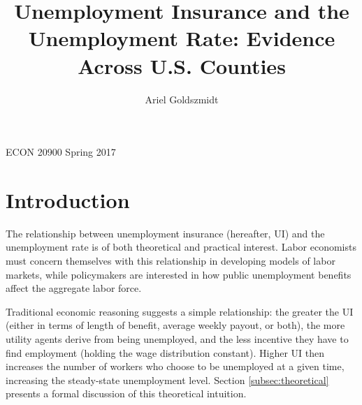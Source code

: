 \documentclass[12pt]{article}
\begin{document}

\title{Unemployment Insurance and the Unemployment Rate: Evidence Across U.S. Counties}

\author{Ariel Goldszmidt}



\date{}              %


\renewcommand{\thefootnote}{\fnsymbol{footnote}}

\singlespacing

\maketitle

\begin{center}\normalsize ECON 20900 \qquad Spring 2017 \end{center}


\onehalfspacing

\setcounter{footnote}{0}
\renewcommand{\thefootnote}{\arabic{footnote}}
\setcounter{page}{1}

\section{Introduction \label{sec:intro}}

The relationship between unemployment insurance (hereafter, UI) and the unemployment rate is of both theoretical and practical interest. Labor economists must concern themselves with this relationship in developing models of labor markets, while policymakers are interested in how public unemployment benefits affect the aggregate labor force.

Traditional economic reasoning suggests a simple relationship: the greater the UI (either in terms of length of benefit, average weekly payout, or both), the more utility agents derive from being unemployed, and the less incentive they have to find employment (holding the wage distribution constant). Higher UI then increases the number of workers who choose to be unemployed at a given time, increasing the steady-state unemployment level. Section \ref{subsec:theoretical} presents a formal discussion of this theoretical intuition. 
\end{document}
